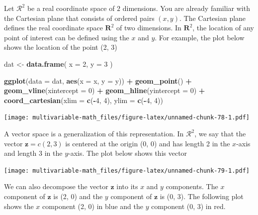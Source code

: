 \documentclass[
]{book}
\newenvironment{Shaded}{\begin{snugshade}}{\end{snugshade}}
\newcommand{\DataTypeTok}[1]{\textcolor[rgb]{0.13,0.29,0.53}{#1}}
\newcommand{\DecValTok}[1]{\textcolor[rgb]{0.00,0.00,0.81}{#1}}
\newcommand{\KeywordTok}[1]{\textcolor[rgb]{0.13,0.29,0.53}{\textbf{#1}}}
\newcommand{\NormalTok}[1]{#1}
\newcommand{\OperatorTok}[1]{\textcolor[rgb]{0.81,0.36,0.00}{\textbf{#1}}}
\newcommand{\StringTok}[1]{\textcolor[rgb]{0.31,0.60,0.02}{#1}}
\theoremstyle{definition}
\theoremstyle{definition}
\theoremstyle{definition}
\theoremstyle{remark}
\begin{document}
Let \(\mathcal{R}^2\) be a real coordinate space of \(2\) dimensions. You are already familiar with the Cartesian plane that consists of ordered pairs \((x, y)\). The Cartesian plane defines the real coordinate space \(\mathbf{R}^2\) of two dimensions. In \(\mathbf{R}^2\), the location of any point of interest can be defined using the \(x\) and \(y\). For example, the plot below shows the location of the point (2, 3)

\begin{Shaded}
\begin{Highlighting}[]
\NormalTok{dat <-}\StringTok{ }\KeywordTok{data.frame}\NormalTok{(}
    \DataTypeTok{x =} \DecValTok{2}\NormalTok{,}
    \DataTypeTok{y =} \DecValTok{3}
\NormalTok{)}

\KeywordTok{ggplot}\NormalTok{(}\DataTypeTok{data =}\NormalTok{ dat, }\KeywordTok{aes}\NormalTok{(}\DataTypeTok{x =}\NormalTok{ x, }\DataTypeTok{y =}\NormalTok{ y)) }\OperatorTok{+}
\StringTok{    }\KeywordTok{geom_point}\NormalTok{() }\OperatorTok{+}
\StringTok{    }\KeywordTok{geom_vline}\NormalTok{(}\DataTypeTok{xintercept =} \DecValTok{0}\NormalTok{) }\OperatorTok{+}\StringTok{ }
\StringTok{    }\KeywordTok{geom_hline}\NormalTok{(}\DataTypeTok{yintercept =} \DecValTok{0}\NormalTok{) }\OperatorTok{+}
\StringTok{    }\KeywordTok{coord_cartesian}\NormalTok{(}\DataTypeTok{xlim =} \KeywordTok{c}\NormalTok{(}\OperatorTok{-}\DecValTok{4}\NormalTok{, }\DecValTok{4}\NormalTok{), }\DataTypeTok{ylim =} \KeywordTok{c}\NormalTok{(}\OperatorTok{-}\DecValTok{4}\NormalTok{, }\DecValTok{4}\NormalTok{))}
\end{Highlighting}
\end{Shaded}

\texttt{[image: multivariable-math\_files/figure-latex/unnamed-chunk-78-1.pdf]}

A vector space is a generalization of this representation. In \(\mathcal{R}^2\), we say that the vector \(\mathbf{z} = c(2, 3)\) is centered at the origin (0, 0) and has length 2 in the \(x\)-axis and length 3 in the \(y\)-axis. The plot below shows this vector

\texttt{[image: multivariable-math\_files/figure-latex/unnamed-chunk-79-1.pdf]}

We can also decompose the vector \(\mathbf{z}\) into its \(x\) and \(y\) components. The \(x\) component of \(\mathbf{z}\) is (2, 0) and the \(y\) component of \(\mathbf{z}\) is (0, 3). The following plot shows the \(x\) component (2, 0) in blue and the \(y\) component (0, 3) in red.
\end{document}
